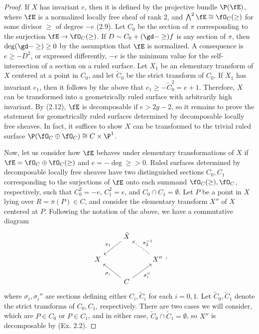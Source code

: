 \documentclass[a4paper]{article}
\begin{document}
\begin{enumerate} [label=\textbf{\arabic*.}, leftmargin=0em]
\begin{proof}
              If $X$ has invariant $e$, then it is defined by the projective bundle $\P(\fE)$, where $\fE$ is a normalized locally free sheaf of rank 2, and $\bigwedge^2 \fE \cong \fO_C(\ge)$ for some divisor $\ge$ of degree $-e$ (2.9).
              Let $C_0$ be the section of $\pi$ corresponding to the surjection $\fE \to \fO_C(\ge)$.
              If $D \sim C_0 + (\gd - \ge)f$ is any section of $\pi$, then $\deg(\gd - \ge) \geq 0$ by the assumption that $\fE$ is normalized.
              A consequence is $e \geq - D^2$, or expressed differently, $-e$ is the minimum value for the self-intersection of a section on a ruled surface.
              Let $X_1$ be an elementary transform of $X$ centered at a point in $C_0$, and let $\tilde{C}_0$ be the strict transform of $C_0$.
              If $X_1$ has invariant $e_1$, then it follows by the above that $e_1 \geq -\tilde{C}_0^2 = e + 1$.
              Therefore, $X$ can be transformed into a geometrically ruled surface with arbitrarily high invariant.
              By (2.12), $\fE$ is decomposable if $e > 2g - 2$, so it remains to prove the statement for geometrically ruled surfaces determined by decomposable locally free sheaves.
              In fact, it suffices to show $X$ can be transformed to the trivial ruled surface $\P(\fO_C \oplus \fO_C) \cong C \times \P^1$.

              Now, let us consider how $\fE$ behaves under elementary transformations of $X$ if $\fE = \fO_C \oplus \fO_C(\ge)$ and $e = -\deg{\ge} > 0$.
              Ruled surfaces determined by decomposable locally free sheaves have two distinguished sections $C_0, C_1$ corresponding to the surjections of $\fE$ onto each summand $\fO_C(\ge), \fO_C$, respectively, such that $C_0^2 = -e$, $C_1^2 = e$, and $C_0 \cap C_1 = \emptyset$.
              Let $P$ be a point in $X$ lying over $R = \pi(P) \in C$, and consider the elementary transform $X''$ of $X$ centered at $P$.
              Following the notation of the above, we have a commutative diagram
              \[ \begin{tikzcd}
                      & \tilde{X} \arrow[ld, "\pi_1"']                     &                                       \\
                      X &                                                    & X'' \arrow[lu, "\pi_2^{-1}"', dashed] \\
                      & C \arrow[ru, "\sigma_i''"'] \arrow[lu, "\sigma_i"] &
                  \end{tikzcd} , \]
              where $\sigma_i, \sigma_i''$ are sections defining either $C_i, \tilde{C}_i$ for each $i = 0, 1$.
              Let $\tilde{C}_0, \tilde{C}_1$ denote the strict transforms of $C_0, C_1$, respectively.
              There are two cases we will consider, which are $P \in C_0$ or $P \in C_1$, and in either case, $\tilde{C}_0 \cap \tilde{C}_1 = \emptyset$, so $X''$ is decomposable by (Ex. 2.2).


\end{proof}
\end{enumerate}
\end{document}
